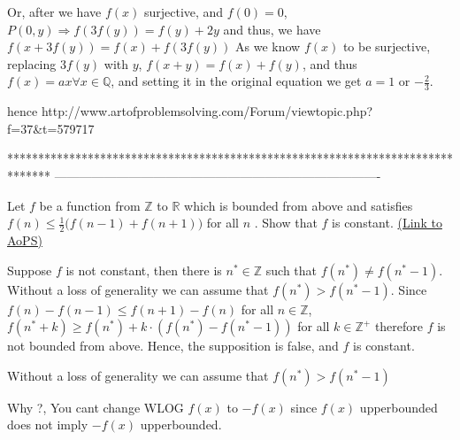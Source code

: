 \begin{solution}
	Or, after we have $f(x)$ surjective, and $f(0) = 0$,
$P(0,y) \Rightarrow f(3f(y)) = f(y)+2y$
and thus, we have $f(x+3f(y)) = f(x)+f(3f(y))$
As we know $f(x)$ to be surjective, replacing $3f(y)$ with $y$, $f(x+y) = f(x)+f(y)$, and thus $f(x)=ax \forall x \in \mathbb Q$, and setting it in the original equation we get $a = 1$ or $-\frac 23$.
\end{solution}



\begin{solution}
	hence
http://www.artofproblemsolving.com/Forum/viewtopic.php?f=37&t=579717
\end{solution}
*******************************************************************************
-------------------------------------------------------------------------------

\begin{problem}
	Let $ f$ be a function from $ \mathbb{Z}$ to $ \mathbb{R}$ which is bounded from above and satisfies
$ f(n)\leq \frac {1}{2} \Big(f(n - 1) + f(n + 1)\Big)$ for all $ n$ . Show that $ f$ is constant.
	\flushright \href{https://artofproblemsolving.com/community/c6h593771}{(Link to AoPS)}
\end{problem}



\begin{solution}
	Suppose $f$ is not constant, then there is $n^\ast\in\mathbb{Z}$ such that $f(n^\ast)\ne f(n^\ast-1)$. Without a loss of generality we can assume that $f(n^\ast) > f(n^\ast-1)$. Since $f(n)-f(n-1)\leq f(n+1)-f(n)$ for all $n\in\mathbb{Z}$, $f(n^\ast+k)\geq f(n^\ast) + k\cdot(f(n^\ast)-f(n^\ast-1))$ for all $k\in\mathbb{Z}^+$ therefore $f$ is not bounded from above. Hence, the supposition is false, and $f$ is constant.
\end{solution}



\begin{solution}
	\begin{tcolorbox}Without a loss of generality we can assume that $f(n^\ast) > f(n^\ast-1)$\end{tcolorbox}
Why ?, You cant change WLOG $f(x)$ to $-f(x)$ since $f(x)$ upperbounded does not imply $-f(x)$ upperbounded.
\end{solution}




